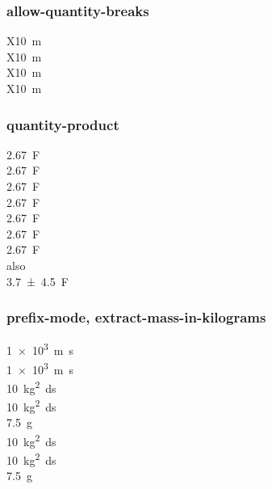 \documentclass{article}
\begin{document}
\subsubsection{allow-quantity-breaks}
\begin{minipage}{3cm}
X\hspace{2.4cm}\qty{10}{\metre} \\
X\hspace{2.1cm}\qty{10}{\metre} \\
X\hspace{2.4cm}\qty{10}{\metre} \\ %
X\hspace{2.1cm}\qty{10}{\metre} %
\end{minipage}

\subsubsection{quantity-product} %
\qty{2.67}{\farad} \\
\qty[quantity-product = \ ]{2.67}{\farad} \\
\qty[quantity-product = ]{2.67}{\farad}\\
\qty[quantity-product = \,]{2.67}{\farad}\\
\qty[quantity-product = \;]{2.67}{\farad}\\
\qty[quantity-product = $\times$]{2.67}{\farad}\\
\qty[color=blue,quantity-product = $\times$]{2.67}{\farad}\\
also\\
\qty[quantity-product = $\times$, separate-uncertainty]{3.7+-4.5}{\farad}


\subsubsection{prefix-mode, extract-mass-in-kilograms}
\qty{1e3}{\metre\second} \\
\qty[prefix-mode = combine-exponent]{1e3}{\metre\second} \\
\qty{10}{\kilo\gram\squared\deci\second} \\
\qty[prefix-mode = extract-exponent]{10}{\kilo\gram\squared\deci\second}\\
\qty[prefix-mode = extract-exponent]{7.5}{\gram} \\
{
\qty{10}{\kilo\gram\squared\deci\second} \\
\qty[prefix-mode = extract-exponent]{10}{\kilo\gram\squared\deci\second} \\
\qty[prefix-mode = extract-exponent]{7.5}{\gram}
}
\end{document}
